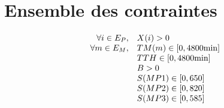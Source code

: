 \documentclass[a4paper, 11pt]{article}
\begin{document}
\section{Ensemble des contraintes}
$$
\begin{array}{r l}
    \forall i\in E_P, & X(i) > 0 \\
    \forall m\in E_M, & TM(m) \in [0, 4800\mbox{min}] \\
                      & TTH \in [0, 4800\mbox{min}] \\
                      & B > 0 \\
                      & S(MP1) \in [0, 650] \\
                      & S(MP2) \in [0, 820] \\
                      & S(MP3) \in [0, 585] \\
\end{array}
$$
\end{document}
